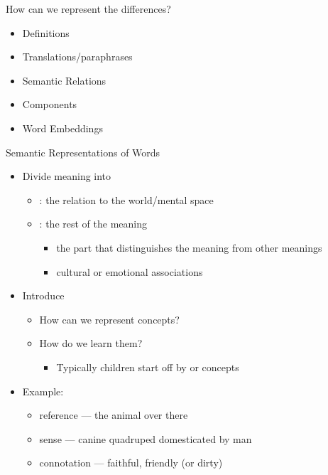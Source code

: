 \begin{frame}{How can we represent the differences?}

\begin{itemize}
\item Definitions
\item Translations/paraphrases
\item Semantic Relations
\item Components
\item Word Embeddings
\end{itemize}

\end{frame}

\begin{frame}{Semantic Representations of Words}

\begin{itemize}\addtolength{\itemsep}{-1ex}
\item Divide meaning into
  \begin{itemize}
  \item {}: the relation to the world/mental space
  \item {}: the rest of the meaning
    \begin{itemize}
    \item {} the part that distinguishes the meaning
      from other meanings
    \item {}  cultural or emotional associations 
    \end{itemize}
  \end{itemize}
\item Introduce  %
  \begin{itemize}
  \item How can we represent concepts?
  \item How do we learn them?
    \begin{itemize}
    \item Typically children start off by  or  concepts
    \end{itemize}
  \end{itemize}
\item Example: 
  \begin{itemize}
  \item reference --- the animal over there
  \item sense --- canine quadruped domesticated by man
  \item connotation --- faithful, friendly (or dirty)
  \end{itemize}
\end{itemize}


\end{frame}

